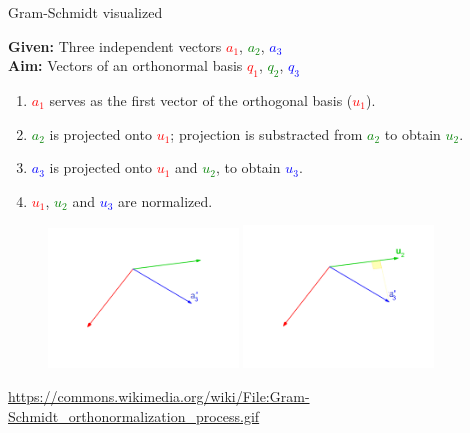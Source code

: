 \documentclass[11pt,compress,t,notes=noshow, xcolor=table]{beamer}
\begin{document}
\begin{vbframe}{Gram-Schmidt visualized}
\framebreak

\begin{scriptsize}

\textbf{Given:} Three independent vectors \textcolor{red}{$a_1$}, \textcolor{green}{$a_2$}, \textcolor{blue}{$a_3$} \\
\textbf{Aim:} Vectors of an orthonormal basis \textcolor{red}{$q_1$}, \textcolor{green}{$q_2$}, \textcolor{blue}{$q_3$}

\begin{enumerate}
  \item<2-> \textcolor{red}{$a_1$} serves as the first vector of the orthogonal basis (\textcolor{red}{$u_1$}).
  \item<3-> \textcolor{green}{$a_2$} is projected onto \textcolor{red}{$u_1$}; projection is substracted from \textcolor{green}{$a_2$}
        to obtain \textcolor{green}{$u_2$}.
  \item \textcolor{blue}{$a_3$} is projected onto \textcolor{red}{$u_1$} and \textcolor{green}{$u_2$},
        to obtain \textcolor{blue}{$u_3$}.
  \item<4-> \textcolor{red}{$u_1$}, \textcolor{green}{$u_2$} and \textcolor{blue}{$u_3$} are normalized.
\end{enumerate}

\end{scriptsize}

\begin{figure}
  \centering
  \includegraphics[width=0.45\textwidth]{figure_man/frame_092_delay-1s.png}
  \includegraphics[width=0.45\textwidth]{figure_man/frame_095_delay-3s.png}
\end{figure}
\tiny{\url{https://commons.wikimedia.org/wiki/File:Gram-Schmidt_orthonormalization_process.gif}}


\end{vbframe}
\end{document}
